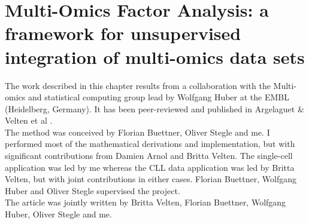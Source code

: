 \graphicspath{{Chapter2/Figs/}}

\section{Multi-Omics Factor Analysis: a framework for unsupervised integration of multi-omics data sets}

The work described in this chapter results from a collaboration with the Multi-omics and statistical computing group lead by Wolfgang Huber at the EMBL (Heidelberg, Germany). It has been peer-reviewed and published in Argelaguet \& Velten et al \cite{Argelaguet2018}.\\

The method was conceived by Florian Buettner, Oliver Stegle and me. I performed most of the mathematical derivations and implementation, but with significant contributions from Damien Arnol and Britta Velten. The single-cell application was led by me whereas the CLL data application was led by Britta Velten, but with joint contributions in either cases. Florian Buettner, Wolfgang Huber and Oliver Stegle supervised the project.\\
The article was jointly written by Britta Velten, Florian Buettner, Wolfgang Huber, Oliver Stegle and me.


